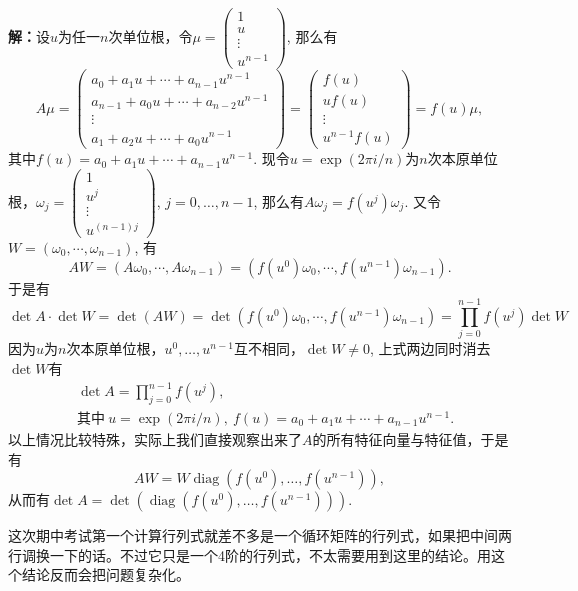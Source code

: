\ifIncludeAnswer

\newpageorvspace

{\bf 解：}设$u$为任一$n$次单位根，令$\mu = \begin{pmatrix} 1 \\ u \\ \vdots \\ u^{n-1} \end{pmatrix}$, 那么有
$$A\mu = \begin{pmatrix} a_0 + a_1u + \cdots + a_{n-1}u^{n-1} \\ a_{n-1} + a_0u + \cdots + a_{n-2}u^{n-1} \\ \vdots \\ a_1 + a_2u + \cdots + a_0u^{n-1} \end{pmatrix} = \begin{pmatrix} f(u) \\ uf(u) \\ \vdots \\ u^{n-1}f(u) \end{pmatrix} = f(u)\mu,$$
其中$f(u) = a_0 + a_1u + \cdots + a_{n-1}u^{n-1}$. 现令$u = \exp(2\pi i/n)$为$n$次本原单位根，$\omega_j = \begin{pmatrix} 1 \\ u^j \\ \vdots \\ u^{(n-1)j} \end{pmatrix}$, $j=0,\ldots,n-1$, 那么有$A\omega_j = f(u^j)\omega_j$. 又令$W = (\omega_0, \cdots, \omega_{n-1})$, 有
$$AW = (A\omega_0, \cdots, A\omega_{n-1}) = (f(u^0)\omega_0, \cdots, f(u^{n-1})\omega_{n-1}).$$
于是有
$$\det A \cdot \det W = \det(AW) = \det(f(u^0)\omega_0, \cdots, f(u^{n-1})\omega_{n-1}) = \prod_{j=0}^{n-1}f(u^j) \det W$$
因为$u$为$n$次本原单位根，$u^0, \ldots, u^{n-1}$互不相同，$\det W \neq 0$, 上式两边同时消去$\det W$有
\begin{align*}
& \det A = \prod_{j=0}^{n-1}f(u^j), \\
& \text{其中}\  u = \exp(2\pi i/n), \ f(u) = a_0 + a_1u + \cdots + a_{n-1}u^{n-1}.
\end{align*}
以上情况比较特殊，实际上我们直接观察出来了$A$的所有特征向量与特征值，于是有
$$AW = W\operatorname{diag}(f(u^0), \ldots, f(u^{n-1})),$$
从而有$\det A = \det(\operatorname{diag}(f(u^0), \ldots, f(u^{n-1})))$.

这次期中考试第一个计算行列式就差不多是一个循环矩阵的行列式，如果把中间两行调换一下的话。不过它只是一个4阶的行列式，不太需要用到这里的结论。用这个结论反而会把问题复杂化。

\fi  %


